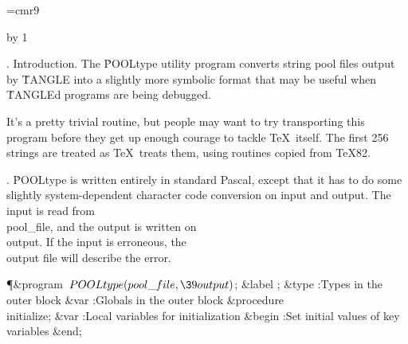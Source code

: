 

\def\hang{\hangindent 3em\indent\ignorespaces}
\font\ninerm=cmr9
\let\mc=\ninerm %
\def\PASCAL{Pascal}

\def\(#1){} %
\def\9#1{} %

\def\title{POOL\lowercase{type}}
\def\contentspagenumber{101}
\def\topofcontents{\null
  \def\titlepage{F} %
  \def\rheader{\mainfont\hfil \contentspagenumber}
  \vfill
  \centerline{\titlefont The {\ttitlefont POOLtype} processor}
  \vskip 15pt
  \centerline{(Version 3, September 1989)}
  \vfill}
\def\botofcontents{\vfill
  \centerline{\hsize 5in\baselineskip9pt
    \vbox{\ninerm\noindent
    The preparation of this report
    was supported in part by the National Science
    Foundation under grants IST-8201926 and MCS-8300984,
    and by the System Development Foundation. `\TeX' is a
    trademark of the American Mathematical Society.}}}
\pageno=\contentspagenumber \advance\pageno by 1


.  Introduction.
The \.{POOLtype} utility program converts string pool files output
by \.{TANGLE} into a slightly more symbolic format that may be useful
when \.{TANGLE}d programs are being debugged.

It's a pretty trivial routine, but people may want to try transporting
this program before they get up enough courage to tackle \TeX\ itself.
The first 256 strings are treated as \TeX\ treats them, using routines
copied from \TeX82.

\fi

. \.{POOLtype} is written entirely in standard \PASCAL, except that it has
to do some slightly system-dependent character code conversion on input
and output. The input is read from \\{pool\_file}, and the output is written
on \\{output}. If the input is erroneous, the \\{output} file will describe
the error.

\Y\P\4\&{program}\1\  $\\{POOLtype}(\\{pool\_file},\39\\{output})$;\6
\4\&{label} ;\6
\4\&{type} :Types in the outer block\X\6
\4\&{var} :Globals in the outer block\X\6
\4\&{procedure}\1\  \\{initialize};\6
\4\&{var} :Local variables for initialization\X\2\6
\&{begin} :Set initial values of key variables\X\6
\&{end};\par
\fi

